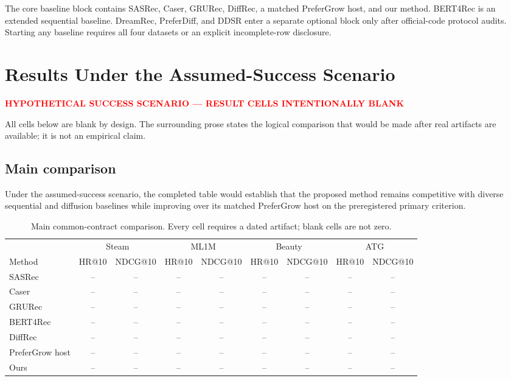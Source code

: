 \documentclass[letterpaper]{article}
\newcommand{\blankcell}{--}
\newcommand{\scenario}{\textcolor{red}{\textbf{HYPOTHETICAL SUCCESS SCENARIO --- RESULT CELLS INTENTIONALLY BLANK}}}
\begin{document}
The core baseline block contains SASRec, Caser, GRURec, DiffRec, a matched PreferGrow host, and our method. BERT4Rec is an extended sequential baseline. DreamRec, PreferDiff, and DDSR enter a separate optional block only after official-code protocol audits. Starting any baseline requires all four datasets or an explicit incomplete-row disclosure.

\section{Results Under the Assumed-Success Scenario}
\begin{center}\scenario\end{center}
All cells below are blank by design. The surrounding prose states the logical comparison that would be made after real artifacts are available; it is not an empirical claim.

\subsection{Main comparison}
Under the assumed-success scenario, the completed table would establish that the proposed method remains competitive with diverse sequential and diffusion baselines while improving over its matched PreferGrow host on the preregistered primary criterion.

\begin{table}[t]
\centering\small
\begin{tabular}{l*{8}{c}}
\toprule
& \multicolumn{2}{c}{Steam} & \multicolumn{2}{c}{ML1M} & \multicolumn{2}{c}{Beauty} & \multicolumn{2}{c}{ATG}\\
Method & HR@10 & NDCG@10 & HR@10 & NDCG@10 & HR@10 & NDCG@10 & HR@10 & NDCG@10\\
\midrule
SASRec & \blankcell&\blankcell&\blankcell&\blankcell&\blankcell&\blankcell&\blankcell&\blankcell\\
Caser & \blankcell&\blankcell&\blankcell&\blankcell&\blankcell&\blankcell&\blankcell&\blankcell\\
GRURec & \blankcell&\blankcell&\blankcell&\blankcell&\blankcell&\blankcell&\blankcell&\blankcell\\
BERT4Rec & \blankcell&\blankcell&\blankcell&\blankcell&\blankcell&\blankcell&\blankcell&\blankcell\\
DiffRec & \blankcell&\blankcell&\blankcell&\blankcell&\blankcell&\blankcell&\blankcell&\blankcell\\
PreferGrow host & \blankcell&\blankcell&\blankcell&\blankcell&\blankcell&\blankcell&\blankcell&\blankcell\\
Ours & \blankcell&\blankcell&\blankcell&\blankcell&\blankcell&\blankcell&\blankcell&\blankcell\\
\bottomrule
\end{tabular}
\caption{Main common-contract comparison. Every cell requires a dated artifact; blank cells are not zero.}
\end{table}
\end{document}
